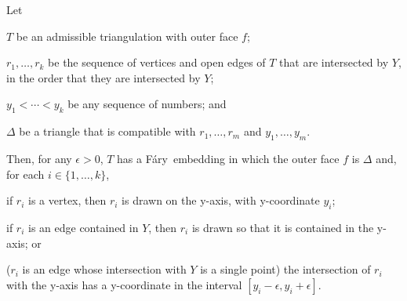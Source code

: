 \documentclass{patmorin}
\newcommand{\Fary}{Fáry}
\begin{document}
\begin{thm}
   Let
   \begin{compactenum}
     \item $T$ be an admissible triangulation with outer face $f$;
     \item $r_1,\ldots,r_k$ be the sequence of vertices and open edges
           of $T$ that are intersected by $Y$, in the order
           that they are intersected by $Y$;
     \item $y_1<\cdots<y_k$ be any sequence of numbers; and
     \item $\Delta$ be a triangle that is compatible with 
           $r_1,\ldots,r_m$ and $y_1,\ldots,y_m$.
  \end{compactenum}
   Then, for any $\epsilon>0$, $T$ has a
   \Fary\ embedding in which the outer face $f$ is $\Delta$
   and, for each $i\in\{1,\ldots,k\}$, 
   \begin{compactenum}
       \item if $r_i$ is a vertex, then $r_i$ is drawn on the y-axis, with y-coordinate $y_i$;
       \item if $r_i$ is an edge contained in $Y$, then $r_i$ is drawn so that
         it is contained in the y-axis; or
       \item ($r_i$ is an edge whose intersection with $Y$ is a single point) 
         the intersection of $r_i$ with the
         y-axis has a y-coordinate in the interval
         $[y_i-\epsilon,y_i+\epsilon]$.
   \end{compactenum}
\end{thm}
\end{document}

